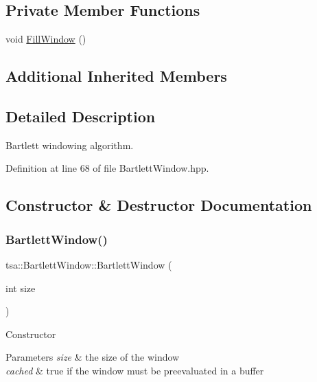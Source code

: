 \subsection*{Private Member Functions}
\begin{DoxyCompactItemize}
\item 
void \hyperlink{classtsa_1_1_bartlett_window_afb3c6c8aa249db673da8dd625ffbb8a5}{Fill\+Window} ()
\end{DoxyCompactItemize}
\subsection*{Additional Inherited Members}


\subsection{Detailed Description}
Bartlett windowing algorithm. 

Definition at line 68 of file Bartlett\+Window.\+hpp.



\subsection{Constructor \& Destructor Documentation}
\mbox{\label{classtsa_1_1_bartlett_window_a9177fa400660b6bdecfcecbfbffeedbe}} 
\subsubsection{\texorpdfstring{Bartlett\+Window()}{BartlettWindow()}\hspace{0.1cm}{\footnotesize\ttfamily [1/2]}}
{\footnotesize\ttfamily tsa\+::\+Bartlett\+Window\+::\+Bartlett\+Window (\begin{DoxyParamCaption}\item[{int}]{size }\end{DoxyParamCaption})\hspace{0.3cm}{\ttfamily [inline]}}

Constructor


\begin{DoxyParams}{Parameters}
{\em size} & the size of the window \\
\hline
{\em cached} & true if the window must be preevaluated in a buffer \\
\hline
\end{DoxyParams}


